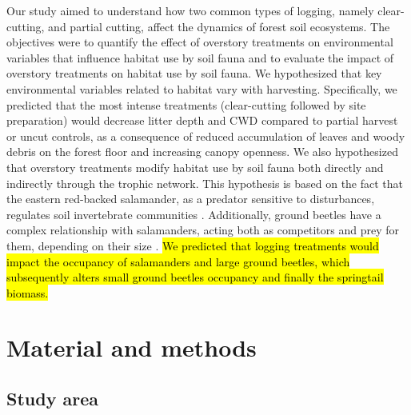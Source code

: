 Our study aimed to understand how two common types of logging, namely clear-cutting, and partial cutting, affect the dynamics of forest soil ecosystems. 
The objectives were to quantify the effect of overstory treatments on environmental variables that influence habitat use by soil fauna 
and to evaluate the impact of overstory treatments on habitat use by soil fauna. 
We hypothesized that key environmental variables related to habitat vary with harvesting. 
Specifically, we predicted that the most intense treatments (clear-cutting followed by site preparation) would decrease litter depth and CWD compared to partial harvest or uncut controls, 
as a consequence of reduced accumulation of leaves and woody debris on the forest floor and increasing canopy openness. 
We also hypothesized that overstory treatments modify habitat use by soil fauna both directly and indirectly through the trophic network. 
This hypothesis is based on the fact that the eastern red-backed salamander, as a predator sensitive to disturbances, regulates soil invertebrate communities \citep{Wyman1998Experimentalassessment,MichaelWalton2005Salamandersforestfloor,Walton2006Salamandersforestfloor,Walton2013Topdownregulation,Hickerson2017Easternredbacked}. 
Additionally, ground beetles have a complex relationship with salamanders, acting both as competitors and prey for them, depending on their size \citep{Jaeger1980MicrohabitatsTerrestrial,loveiEcologyBehaviorGround1996,Gall2003BehavioralInteractions}. 
\hl{We predicted that logging treatments would impact the occupancy of salamanders and large ground beetles, which subsequently alters small ground beetles occupancy and finally the springtail biomass. }


\section*{Material and methods}
\label{sec:matmet1}

\subsection*{Study area}
\label{subsec:area}


